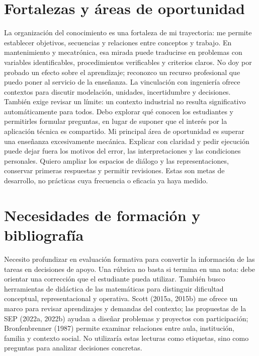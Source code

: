 \documentclass[spanish,letterpaper,oneside]{article}
\begin{document}
\section{Fortalezas y áreas de oportunidad}
La organización del conocimiento es una fortaleza de mi trayectoria: me permite establecer objetivos, secuencias y relaciones entre conceptos y trabajo. En mantenimiento y mecatrónica, esa mirada puede traducirse en problemas con variables identificables, procedimientos verificables y criterios claros. No doy por probado un efecto sobre el aprendizaje; reconozco un recurso profesional que puedo poner al servicio de la enseñanza.
La vinculación con ingeniería ofrece contextos para discutir modelación, unidades, incertidumbre y decisiones. También exige revisar un límite: un contexto industrial no resulta significativo automáticamente para todos. Debo explorar qué conocen los estudiantes y permitirles formular preguntas, en lugar de suponer que el interés por la aplicación técnica es compartido.
Mi principal área de oportunidad es superar una enseñanza excesivamente mecánica. Explicar con claridad y pedir ejecución puede dejar fuera los motivos del error, las interpretaciones y las condiciones personales. Quiero ampliar los espacios de diálogo y las representaciones, conservar primeras respuestas y permitir revisiones. Estas son metas de desarrollo, no prácticas cuya frecuencia o eficacia ya haya medido.
\section{Necesidades de formación y bibliografía}
Necesito profundizar en evaluación formativa para convertir la información de las tareas en decisiones de apoyo. Una rúbrica no basta si termina en una nota: debe orientar una corrección que el estudiante pueda utilizar. También busco herramientas de didáctica de las matemáticas para distinguir dificultad conceptual, representacional y operativa.
Scott (2015a, 2015b) me ofrece un marco para revisar aprendizajes y demandas del contexto; las propuestas de la SEP (2022a, 2022b) ayudan a diseñar problemas y proyectos con participación; Bronfenbrenner (1987) permite examinar relaciones entre aula, institución, familia y contexto social. No utilizaría estas lecturas como etiquetas, sino como preguntas para analizar decisiones concretas.
\end{document}
